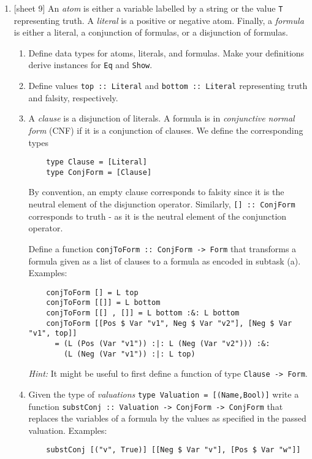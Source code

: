 \documentclass{article}
\def\code#1{\texttt{#1}}
\begin{document}
\begin{enumerate}
    \item {[sheet 9]} An \textit{atom} is either a variable labelled by a string or the value \code{T} representing truth. A \textit{literal} is a positive or negative atom. Finally, a \textit{formula} is either a literal, a conjunction of formulas, or a disjunction of formulas.
        \begin{enumerate}
            \item Define data types for atoms, literals, and formulas. Make your definitions derive instances for \code{Eq} and \code{Show}.
            \item Define values \code{top :: Literal} and \code{bottom :: Literal} representing truth and falsity, respectively.
            \item A \textit{clause} is a disjunction of literals. A formula is in \textit{conjunctive normal form} (CNF) if it is a conjunction of clauses. We define the corresponding types
                \begin{verbatim}
    type Clause = [Literal]
    type ConjForm = [Clause]
                \end{verbatim}
                By convention, an empty clause corresponds to falsity since it is the neutral element of the disjunction operator. Similarly, \code{[] :: ConjForm} corresponds to truth - as it is the neutral element of the conjunction operator. \par
                Define a function \code{conjToForm :: ConjForm -> Form} that transforms a formula given as a list of clauses to a formula as encoded in subtask (a). Examples:
                \begin{verbatim}
    conjToForm [] = L top
    conjToForm [[]] = L bottom
    conjToForm [[] , []] = L bottom :&: L bottom
    conjToForm [[Pos $ Var "v1", Neg $ Var "v2"], [Neg $ Var "v1", top]]
      = (L (Pos (Var "v1")) :|: L (Neg (Var "v2"))) :&:
        (L (Neg (Var "v1")) :|: L top)
                \end{verbatim}
                \textit{Hint:} It might be useful to first define a function of type \code{Clause -> Form}.
            \item Given the type of \textit{valuations} \code{type Valuation = [(Name,Bool)]} write a function \code{substConj :: Valuation -> ConjForm -> ConjForm} that replaces the variables of a formula by the values as specified in the passed valuation. Examples:
                \begin{verbatim}
    substConj [("v", True)] [[Neg $ Var "v"], [Pos $ Var "w"]]

\end{verbatim}
\end{enumerate}
\end{enumerate}
\end{document}
